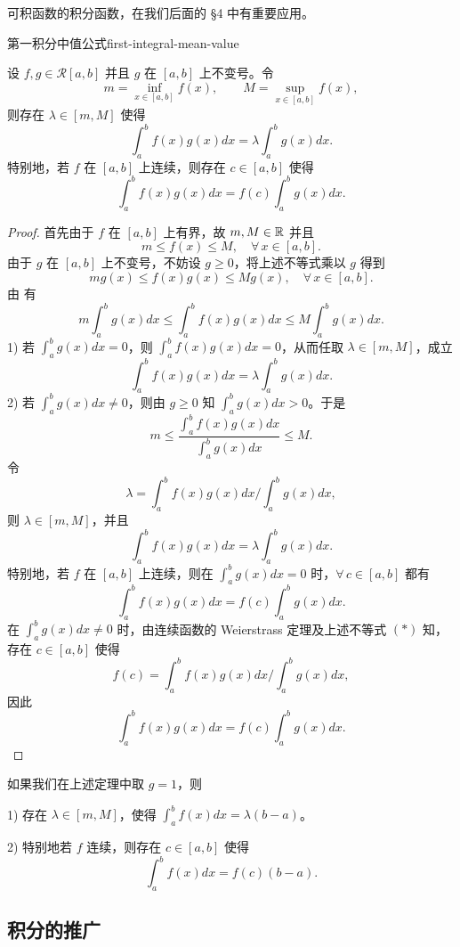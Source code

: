 可积函数的积分函数，在我们后面的 §4 中有重要应用。

\begin{mythm}{第一积分中值公式}{first-integral-mean-value}

	设 \(f,g\in\mathscr{R}[a,b]\) 并且 \(g\) 在 \([a,b]\) 上不变号。令
	\[
	m=\inf_{x\in[a,b]}f(x),\qquad M=\sup_{x\in[a,b]}f(x),
	\]
	则存在 \(\lambda\in[m,M]\) 使得
	\[
	\int_a^b f(x)g(x)dx=\lambda\int_a^b g(x)dx.
	\]
	特别地，若 \(f\) 在 \([a,b]\) 上连续，则存在 \(c\in[a,b]\) 使得
	\[
	\int_a^b f(x)g(x)dx=f(c)\int_a^b g(x)dx.
	\]

\end{mythm}

\begin{proof}

	首先由于 \(f\) 在 \([a,b]\) 上有界，故 \(m,M\in\mathbb{R}\) 并且
	\[
	m\le f(x)\le M,\quad\forall\,x\in[a,b].
	\]
	由于 \(g\) 在 \([a,b]\) 上不变号，不妨设 \(g\ge0\)，将上述不等式乘以 \(g\) 得到
	\[
	m g(x)\le f(x)g(x)\le M g(x),\quad\forall\,x\in[a,b].
	\]
	由 有
	\[
	m\int_a^b g(x)dx\le\int_a^b f(x)g(x)dx\le M\int_a^b g(x)dx.
	\]
	1) 若 \(\displaystyle\int_a^b g(x)dx=0\)，则 \(\displaystyle\int_a^b f(x)g(x)dx=0\)，从而任取 \(\lambda\in[m,M]\)，成立
	\[
	\int_a^b f(x)g(x)dx=\lambda\int_a^b g(x)dx.
	\]
	2) 若 \(\displaystyle\int_a^b g(x)dx\neq0\)，则由 \(g\ge0\) 知 \(\displaystyle\int_a^b g(x)dx>0\)。于是
	\[
	m\le\frac{\int_a^b f(x)g(x)dx}{\int_a^b g(x)dx}\le M. \tag{*}
	\]
	令
	\[
	\lambda=\int_a^b f(x)g(x)dx\Big/\int_a^b g(x)dx,
	\]
	则 \(\lambda\in[m,M]\)，并且
	\[
	\int_a^b f(x)g(x)dx=\lambda\int_a^b g(x)dx.
	\]
	特别地，若 \(f\) 在 \([a,b]\) 上连续，则在 \(\displaystyle\int_a^b g(x)dx=0\) 时，\(\forall\,c\in[a,b]\) 都有
	\[
	\int_a^b f(x)g(x)dx=f(c)\int_a^b g(x)dx.
	\]
	在 \(\displaystyle\int_a^b g(x)dx\neq0\) 时，由连续函数的 Weierstrass 定理及上述不等式 \((*)\) 知，存在 \(c\in[a,b]\) 使得
	\[
	f(c)=\int_a^b f(x)g(x)dx\Big/\int_a^b g(x)dx,
	\]
	因此
	\[
	\int_a^b f(x)g(x)dx=f(c)\int_a^b g(x)dx.
	\]

\end{proof}

如果我们在上述定理中取 \(g=1\)，则

1) 存在 \(\lambda\in[m,M]\)，使得 \(\displaystyle\int_a^b f(x)dx=\lambda(b-a)\)。

2) 特别地若 \(f\) 连续，则存在 \(c\in[a,b]\) 使得
\[
\int_a^b f(x)dx=f(c)(b-a).
\]

\subsection{积分的推广}

